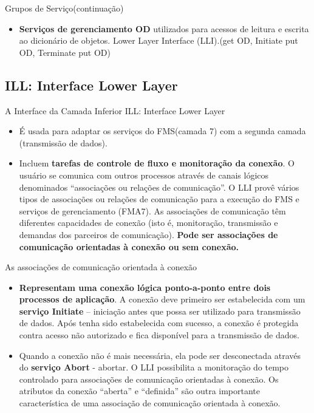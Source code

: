 \documentclass{beamer}
\begin{document}
\begin{frame}{Grupos de Serviço(continuação)}

\begin{itemize}
\item \textbf{Serviços de gerenciamento OD} utilizados para acessos de leitura e escrita ao dicionário de objetos. Lower Layer Interface (LLI).(get OD, Initiate put OD, Terminate put OD)

\end{itemize}
\end{frame}

\subsection{ILL: Interface Lower Layer}
\begin{frame}{A Interface da Camada Inferior ILL: Interface Lower Layer}
\begin{itemize}
\item É usada para adaptar os serviços do FMS(camada 7) com a segunda camada (transmissão de dados).

\item Incluem \textbf{tarefas de controle de fluxo e monitoração da conexão}. O usuário se comunica com outros processos através de canais lógicos denominados “associações ou relações de comunicação”. O LLI provê vários tipos de associações ou relações de comunicação para a execução do FMS e serviços de gerenciamento (FMA7). As associações de comunicação têm diferentes capacidades de conexão (isto é, monitoração, transmissão e demandas dos parceiros de comunicação). \textbf{Pode ser associações de comunicação orientadas à conexão ou sem conexão.}
\end{itemize}
\end{frame}

\begin{frame}{As associações de comunicação orientada à conexão}
\begin{itemize}

\item 
\textbf{Representam uma conexão lógica ponto-a-ponto entre dois processos de aplicação}. A conexão deve primeiro ser estabelecida com um \textbf{serviço Initiate} – iniciação antes que possa ser utilizado para transmissão de dados. Após tenha sido estabelecida com sucesso, a conexão é protegida contra acesso não autorizado e fica disponível para a transmissão de dados. 

\item
Quando a conexão não é mais necessária, ela pode ser desconectada através do \textbf{serviço Abort} - abortar. O LLI possibilita a monitoração do tempo controlado para associações de comunicação orientadas à conexão. Os atributos da conexão “aberta” e “definida” são outra importante característica de uma associação de comunicação orientada à conexão. 
\end{itemize}

\end{frame}
\end{document}
